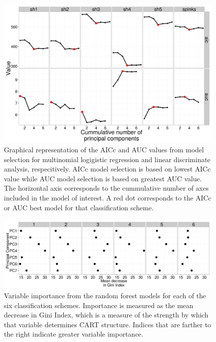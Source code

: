 \documentclass[12pt,letterpaper]{article}
\begin{document}
\begin{figure}[ht]
  \centering
  \includegraphics[height = \textheight, width = \textwidth, keepaspectratio = true]{figure/sel_val}
  \caption{Graphical representation of the AICc and AUC values from model selection for multinomial logigistic regression and linear discriminate analysis, respecitively. AICc model selection is based on lowest AICc value while AUC model selection is based on greatest AUC value. The horizontal axis corresponds to the cummulative number of axes included in the model of interest. A red dot corresponds to the AICc or AUC best model for that classification scheme.}
  \label{fig:sel}
\end{figure}

\begin{figure}[ht]
  \centering
  \includegraphics[height = \textheight, width = \textwidth, keepaspectratio = true]{figure/var_imp}
  \caption{Variable importance from the random forest models for each of the six classification schemes. Importance is measured as the mean decrease in Gini Index, which is a measure of the strength by which that variable determines CART structure. Indices that are farther to the right indicate greater variable importance.}
  \label{fig:var_imp}
\end{figure}
\end{document}

